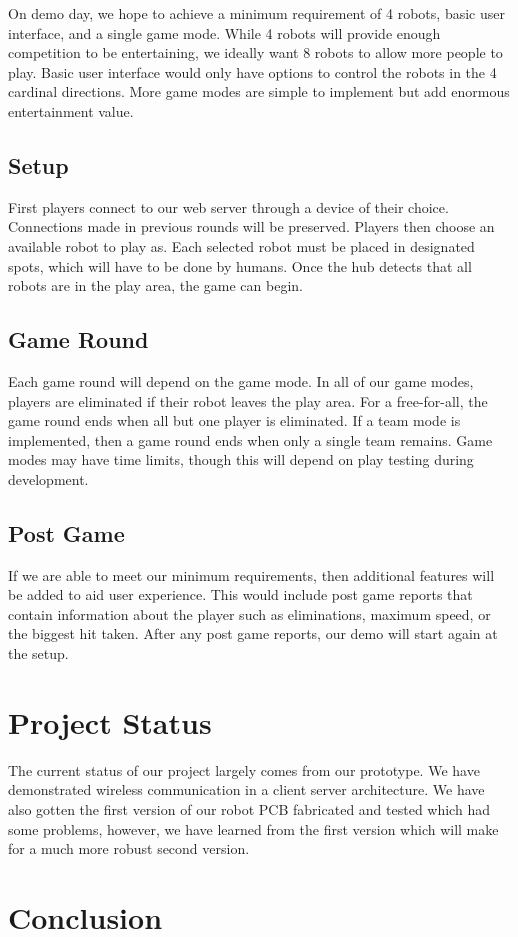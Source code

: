 \documentclass[11pt]{ieeeconf}
\begin{document}
On demo day, we hope to achieve a minimum requirement of 4 robots, basic user interface, and a single game mode. While 4 robots will provide enough competition to be entertaining, we ideally want 8 robots to allow more people to play. Basic user interface would only have options to control the robots in the 4 cardinal directions. More game modes are simple to implement but add enormous entertainment value.

\subsection{Setup}
First players connect to our web server through a device of their choice. Connections made in previous rounds will be preserved. Players then choose an available robot to play as. Each selected robot must be placed in designated spots, which will have to be done by humans. Once the hub detects that all robots are in the play area, the game can begin. 

\subsection{Game Round}
Each game round will depend on the game mode. In all of our game modes, players are eliminated if their robot leaves the play area. For a free-for-all, the game round ends when all but one player is eliminated. If a team mode is implemented, then a game round ends when only a single team remains. Game modes may have time limits, though this will depend on play testing during development.

\subsection{Post Game}
If we are able to meet our minimum requirements, then additional features will be added to aid user experience. This would include post game reports that contain information about the player such as eliminations, maximum speed, or the biggest hit taken. After any post game reports, our demo will start again at the setup.

\section{Project Status}
The current status of our project largely comes from our prototype. We have demonstrated wireless communication in a client server architecture. We have also gotten the first version of our robot PCB fabricated and tested which had some problems, however, we have learned from the first version which will make for a much more robust second version. 

\section{Conclusion}



\end{document}
